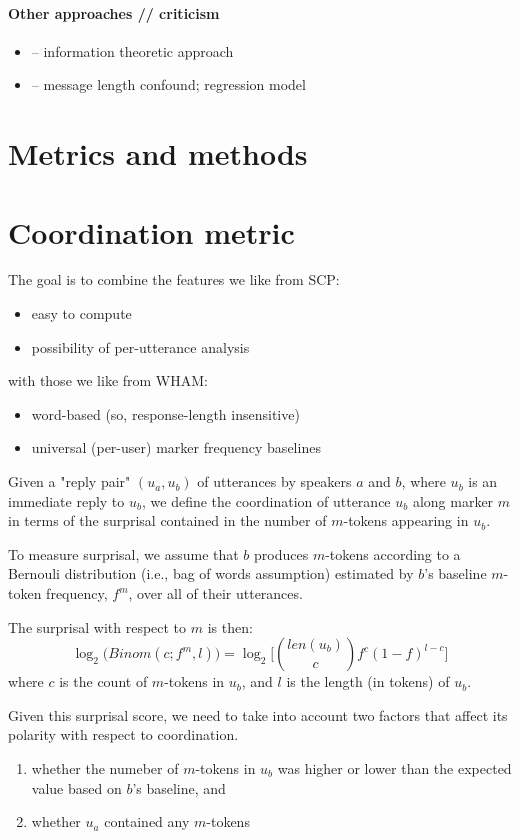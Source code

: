 \documentclass[12pt]{scrartcl}
\begin{document}
\paragraph{Other approaches // criticism}
\begin{itemize}
\item \cite{gao_understanding_2015} -- information theoretic approach
\item \cite{xu_not_2018} -- message length confound; regression model
\end{itemize}


\section{Metrics and methods}

\section{Coordination metric}

The goal is to combine the features we like from SCP:
\begin{itemize}
	\item easy to compute
	\item possibility of per-utterance analysis
\end{itemize}
with those we like from WHAM:
\begin{itemize}
	\item word-based (so, response-length insensitive)
	\item universal (per-user) marker frequency baselines 
\end{itemize}

Given a "reply pair" $(u_a, u_b)$ of utterances by speakers $a$ and $b$, where $u_b$ is an immediate reply to $u_b$, we define the coordination of utterance $u_b$ along marker $m$ in terms of the surprisal contained in the number of $m$-tokens appearing in $u_b$.

To measure surprisal, we assume that $b$ produces $m$-tokens according to a Bernouli distribution (i.e., bag of words assumption) estimated by $b$'s baseline $m$-token frequency, $f^m$, over all of their utterances.

The surprisal with respect to $m$ is then:
\[
	\log_2\big(Binom(c;f^m,l)\big) = \log_2\Big[\binom{len(u_b)}{c} f^{c}(1-f)^{l-c}\Big]
\]
where $c$ is the count of $m$-tokens in $u_b$, and $l$ is the length (in tokens) of $u_b$.

Given this surprisal score, we need to take into account two factors that affect its polarity with respect to coordination.
\begin{enumerate}
	\item whether the numeber of $m$-tokens in $u_b$ was higher or lower than the expected value based on $b$'s baseline, and
	\item whether $u_a$ contained any $m$-tokens
\end{enumerate}
\end{document}
